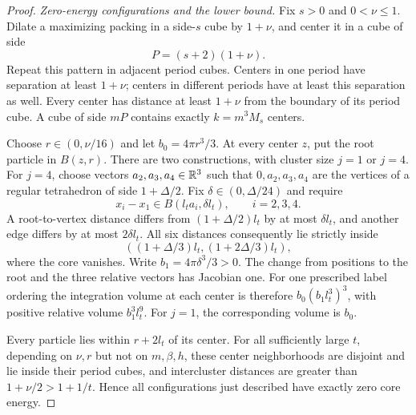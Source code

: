 \begin{proof}
\emph{Zero-energy configurations and the lower bound.}
Fix \(s>0\) and \(0<\nu\le1\).  Dilate a maximizing packing in a
side-\(s\) cube by \(1+\nu\), and center it in a cube of side
\[
 P=(s+2)(1+\nu).
\]
Repeat this pattern in adjacent period cubes.  Centers in one period
have separation at least \(1+\nu\); centers in different periods have
at least this separation as well.  Every center has distance at least
\(1+\nu\) from the boundary of its period cube.  A cube of side \(mP\)
contains exactly \(k=m^3M_s\) centers.

Choose \(r\in(0,\nu/16)\) and let \(b_0=4\pi r^3/3\).
At every center \(z\), put the root particle in \(B(z,r)\).
There are two constructions, with cluster size \(j=1\) or \(j=4\).
For \(j=4\), choose vectors \(a_2,a_3,a_4\in\mathbb R^3\) such that
\(0,a_2,a_3,a_4\) are the vertices of a regular tetrahedron of side
\(1+\Delta/2\).  Fix \(\delta\in(0,\Delta/24)\) and require
\[
 x_i-x_1\in B(l_t a_i,\delta l_t),\qquad i=2,3,4.
\]
A root-to-vertex distance differs from
\((1+\Delta/2)l_t\) by at most \(\delta l_t\), and another edge
differs by at most \(2\delta l_t\).  All six distances consequently
lie strictly inside
\[
 ((1+\Delta/3)l_t,(1+2\Delta/3)l_t),
\]
where the core vanishes.  Write \(b_1=4\pi\delta^3/3>0\).
The change from positions to the root and the three relative vectors
has Jacobian one.  For one prescribed label ordering the integration
volume at each center is therefore
\(b_0(b_1l_t^3)^3\), with positive relative volume \(b_1^3l_t^9\).
For \(j=1\), the corresponding volume is \(b_0\).

Every particle lies within \(r+2l_t\) of its center.  For all sufficiently
large \(t\), depending on \(\nu,r\) but not on \(m,\beta,h\), these
center neighborhoods are disjoint and lie inside their period cubes,
and intercluster distances are greater than
\(1+\nu/2>1+1/t\).  Hence all configurations just described have
exactly zero core energy.


\end{proof}
